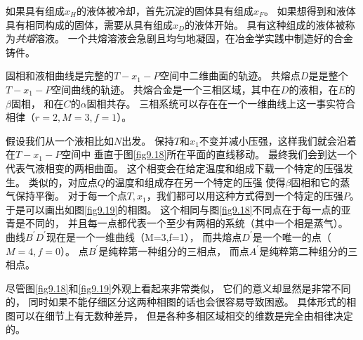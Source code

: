 如果具有组成$x_H$的液体被冷却，首先沉淀的固体具有组成$x_F$。
如果想得到和液体具有相同构成的固体，需要从具有组成$x_D$的液体开始。
具有这种组成的液体被称为{\it 共熔}溶液。
一个共熔溶液会急剧且均匀地凝固，在冶金学实践中制造好的合金铸件。

固相和液相曲线是完整的$T-x_1-P$空间中二维曲面的轨迹。
共熔点$D$是是整个$T-x_1-P$空间曲线的轨迹。
共熔合金是一个三相区域，其中在$D$的液相，在$E$的$\beta$固相，
和在$C$的$\alpha$固相共存。
三相系统可以存在在一个一维曲线上这一事实符合相律（$r=2,M=3,f=1$）。

假设我们从一个液相比如$N$出发。
保持$T$和$x_1$不变并减小压强，这样我们就会沿着在$T-x_1-P$空间中
垂直于图\ref{fig9.18}所在平面的直线移动。
最终我们会到达一个代表气液相变的两相曲面。
这个相变会在给定温度和组成下载一个特定的压强发生。
类似的，对应点$Q$的温度和组成存在另一个特定的压强
使得$\beta$固相和它的蒸气保持平衡。
对于每一个点$T,x_1$，我们都可以用这种方式得到一个特定的压强$P$。
于是可以画出如图\ref{fig9.19}的相图。
这个相同与图\ref{fig9.18}不同点在于每一点的亚青是不同的，
并且每一点都代表一个至少有两相的系统（其中一个相是蒸气）。
曲线$B^\prime D^\prime$现在是一个一维曲线（M=3,f=1），
而共熔点$D^\prime$是一个唯一的点（$M=4,f=0$）。
点$B^\prime$是纯粹第一种组分的三相点，
而点$A^\prime$是纯粹第二种组分的三相点。

尽管图\ref{fig9.18}和\ref{fig9.19}外观上看起来非常类似，
它们的意义却显然是非常不同的，
同时如果不能仔细区分这两种相图的话也会很容易导致困惑。
具体形式的相图可以在细节上有无数种差异，
但是各种多相区域相交的维数是完全由相律决定的。